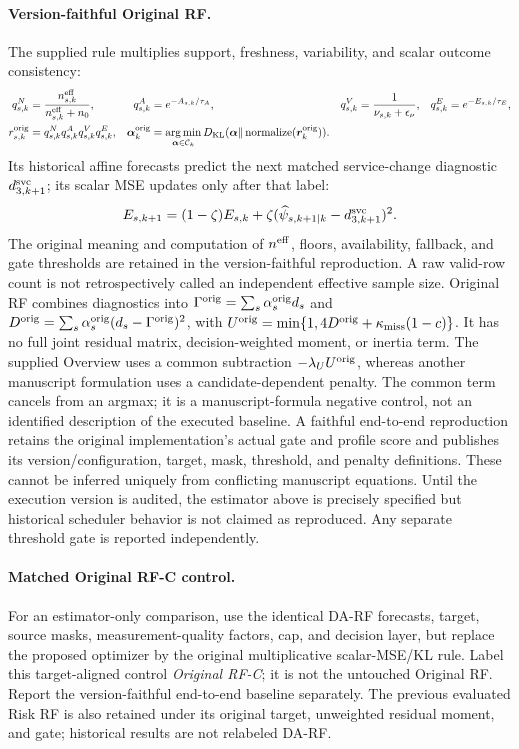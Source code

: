 \documentclass[10pt]{article}
\DeclareMathOperator*{\argmin}{arg\,min}
\begin{document}
\paragraph{Version-faithful Original RF.}
The supplied rule multiplies support, freshness, variability, and scalar
outcome consistency:
\begin{align}
 q^N_{s,k}&=\frac{n_{s,k}^{\rm eff}}{n_{s,k}^{\rm eff}+n_0},&
 q^A_{s,k}&=e^{-A_{s,k}/\tau_A},&
 q^V_{s,k}&=\frac1{\nu_{s,k}+\epsilon_\nu},&
 q^E_{s,k}&=e^{-E_{s,k}/\tau_E},\\
 r^{\rm orig}_{s,k}&=q^N_{s,k}q^A_{s,k}q^V_{s,k}q^E_{s,k},&
 \boldsymbol\alpha_k^{\rm orig}&=\argmin_{\boldsymbol\alpha\in\mathcal C_k}
 D_{\rm KL}(\boldsymbol\alpha\Vert
          \operatorname{normalize}(\boldsymbol r_k^{\rm orig})).
 \label{eq:original-rf}
\end{align}
Its historical affine forecasts predict the next matched service-change
diagnostic $d^{\rm svc}_{3,k+1}$; its scalar MSE updates only after that label:
\begin{equation}
 E_{s,k+1}=(1-\zeta)E_{s,k}
 +\zeta(\widehat\psi_{s,k+1|k}-d^{\rm svc}_{3,k+1})^2.
\end{equation}
The original meaning and computation of $n^{\rm eff}$, floors, availability,
fallback, and gate thresholds are retained in the version-faithful reproduction.
A raw valid-row count is not retrospectively called an independent effective
sample size. Original RF combines diagnostics into
$\Gamma^{\rm orig}=\sum_s\alpha_s^{\rm orig}d_s$ and
$D^{\rm orig}=\sum_s\alpha_s^{\rm orig}(d_s-\Gamma^{\rm orig})^2$, with
$U^{\rm orig}=\min\{1,4D^{\rm orig}+\kappa_{\rm miss}(1-c)\}$.
It has no full joint residual matrix, decision-weighted moment, or inertia term.
The supplied Overview uses a common subtraction $-\lambda_U U^{\rm orig}$,
whereas another manuscript formulation uses a candidate-dependent penalty.
The common term cancels from an argmax; it is a manuscript-formula negative
control, not an identified description of the executed baseline. A faithful
end-to-end reproduction retains the original implementation's actual gate and
profile score and publishes its version/configuration, target, mask, threshold,
and penalty definitions. These cannot be inferred uniquely from conflicting
manuscript equations. Until the execution version is audited, the estimator
above is precisely specified but historical scheduler behavior is not claimed
as reproduced. Any separate threshold gate is reported independently.

\paragraph{Matched Original RF-C control.}
For an estimator-only comparison, use the identical DA-RF forecasts, target,
source masks, measurement-quality factors, cap, and decision layer, but replace
the proposed optimizer by the original multiplicative scalar-MSE/KL rule.
Label this target-aligned control \emph{Original RF-C}; it is not the untouched
Original RF. Report the version-faithful end-to-end baseline separately.
The previous evaluated Risk RF is also retained under its original target,
unweighted residual moment, and gate; historical results are not relabeled DA-RF.
\end{document}
